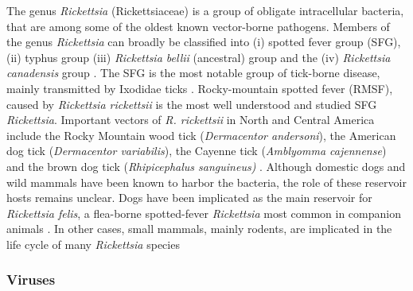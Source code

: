 \documentclass[a4paper, nobind]{templates/ociamthesis}
\begin{document}
The genus \emph{Rickettsia} (Rickettsiaceae) is a group of obligate intracellular bacteria, that are among some of the oldest known vector-borne pathogens.
Members of the genus \emph{Rickettsia} can broadly be classified into (i) spotted fever group (SFG), (ii) typhus group (iii) \emph{Rickettsia bellii} (ancestral) group and the (iv) \emph{Rickettsia canadensis} group \autocite{merhjRickettsialEvolutionLight2010}.
The SFG is the most notable group of tick-borne disease, mainly transmitted by Ixodidae ticks \autocite{parolaUpdateTickBorneRickettsioses2013}.
Rocky-mountain spotted fever (RMSF), caused by \emph{Rickettsia rickettsii} is the most well understood and studied SFG \emph{Rickettsia}.
Important vectors of \emph{R. rickettsii} in North and Central America include the Rocky Mountain wood tick (\emph{Dermacentor andersoni}), the American dog tick (\emph{Dermacentor variabilis}), the Cayenne tick (\emph{Amblyomma cajennense}) and the brown dog tick (\emph{Rhipicephalus sanguineus)} \autocite{dantas-torresRockyMountainSpotted2007,lopez-perezDiversityRickettsiaeDomestic2021}.
Although domestic dogs and wild mammals have been known to harbor the bacteria, the role of these reservoir hosts remains unclear.
Dogs have been implicated as the main reservoir for \emph{Rickettsia felis}, a flea-borne spotted-fever \emph{Rickettsia} most common in companion animals \autocite{ng-nguyenDomesticDogsAre2020}.
In other cases, small mammals, mainly rodents, are implicated in the life cycle of many \emph{Rickettsia} species \autocite{tomassoneNeglectedAspectsTickborne2018,parisBriefHistoryMajor2020}

\hypertarget{viruses}{%
\subsubsection{Viruses}\label{viruses}}
\end{document}
